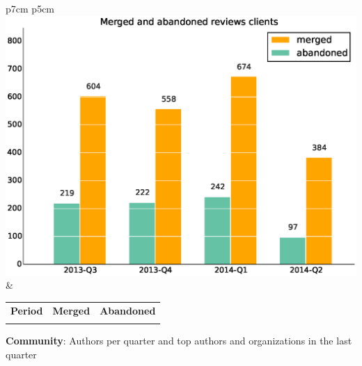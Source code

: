 \documentclass[a4wide,11pt]{report}
\begin{document}
\begin{tabular}{p{7cm} p{5cm}}
    \vspace{0pt} 
    \includegraphics[scale=.35]{figs/submitted_reviewsclients.eps}
    & 
    \vspace{0pt}
    \begin{tabular}{l|r|r|}%
    \bfseries Period & \bfseries Merged & \bfseries Abandoned %
    \csvreader[head to column names]{data/submitted_reviewsclients.csv}{}%
    {\\ & \merged & \abandoned}
    \end{tabular}
\end{tabular}


\textbf{Community}: Authors per quarter and top authors and organizations in the last quarter
\end{document}
